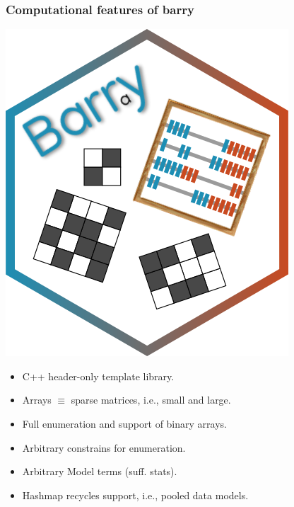 \documentclass[aspectratio=169, 9pt]{beamer}
\begin{document}
\begin{frame}
	\frametitle{Computational features of \textbf{barry}}
	\begin{minipage}[m]{.55\linewidth}
		\vspace{-1cm}\raggedleft\includegraphics[width=.35\linewidth]{barry-logo.png}\\\vspace{-.5cm}
		\raggedright
		\small
		\begin{itemize}
			\item<2-> C++ header-only template library.
			\item<3-> Arrays $\equiv$ sparse matrices, i.e., small and large.
			\item<4-> Full enumeration and support of binary arrays.
			\item<5-> Arbitrary constrains for enumeration.
		\end{itemize}
		\begin{itemize}
			\item<7-> Arbitrary Model terms (suff. stats).
			\item<8-> Hashmap recycles support, i.e., pooled data models.
		\end{itemize}
	\end{minipage}\hfill
	\begin{minipage}[m]{.44\linewidth}
		\centering
	\end{minipage}
\end{frame}
\end{document}
